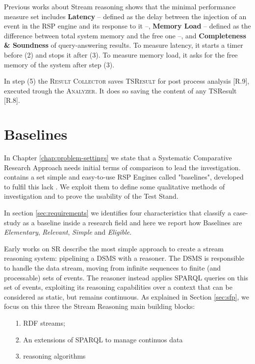Previous works about Stream reasoning \cite{} shows that the minimal performance measure set includes \textbf{Latency} -- defined as the delay between the injection of an event in the RSP engine and its response to it --, \textbf{Memory Load} -- defined as the difference between total system memory and the free one --, and \textbf{Completeness \& Soundness} of query-answering results. To measure latency, it starts a timer before (2) and stops it after (3). To measure memory load, it asks for the free memory of the system after step (3).

In step (5) the \textsc{Result Collector} saves \textsc{TSResult} for post process analysis [R.9], executed trough the \textsc{Analyzer}. It does so saving the content of any TSResult  [R.8].

\section{Baselines}
\label{sec:baselines}

\noindent In Chapter \ref{chap:problem-settings} we state that a Systematic Comparative Research Approach needs initial terms of comparison to lead the investigation. \name contains a set simple and easy-to-use RSP Engines called "baselines", developed to fulfil this lack . 
We exploit them to define some qualitative methods of investigation and to prove the usability of the Test Stand. 

In section \ref{sec:requirements} we identifies four characteristics that classify a case-study as a baseline inside a research field and here we report how \name Baselines are \textit{Elementary}, \textit{Relevant}, \textit{Simple} and \textit{Eligible}.

Early works on SR \cite{DBLP:conf/fis/ValleCBBC08,Walavalkar08streamingknowledge} describe the most simple approach to create a stream reasoning system: pipelining a DSMS with a reasoner. The DSMS is responsible to handle the data stream, moving from infinite sequences to finite (and processable) sets of events. The reasoner instead applies SPARQL queries on this set of events, exploiting its reasoning capabilities over a context that can be considered as static, but remains continuous.  As explained in Section \ref{sec:sfp}, we focus on this three the Stream Reasoning main building blocks: \begin{enumerate}
\item[1.] RDF streams;
\item[2.] An extensions of SPARQL to manage continuos data
\item[3.] reasoning algorithms
\end{enumerate}

